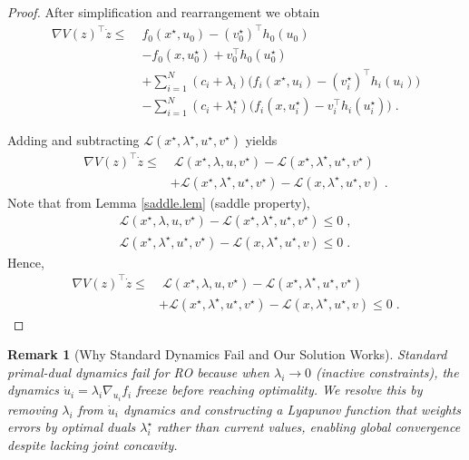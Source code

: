 \documentclass[journal,twoside,web]{ieeecolor}
\newtheorem{remark}{Remark}
\begin{document}
\begin{proof}
After simplification and rearrangement we obtain
\begin{align*}
\nabla V(z)^\top \dot z\leq \; & f_0(x^\star,u_0)-(v_0^\star)^\top
h_0(u_0)\\
&-f_0(x,u_0^\star)+v_0^\top h_0(u_0^\star)\\
&+\sum_{i=1}^N(c_i+\lambda_i) \Big(f_i(x^\star,u_i)-(v_i^\star)^\top h_i(u_i)\Big)\\
&-\sum_{i=1}^N(c_i+\lambda_i^\star) \Big(f_i(x,u_i^\star)-v_i^\top h_i(u_i^\star)\Big)\;.
\end{align*}

Adding and subtracting $\mathcal{L}(x^\star,\lambda^\star,u^\star,v^\star)$ yields
\begin{align} \label{deriv_v}
\nabla V(z)^\top \dot z\leq&\; \mathcal{L}(x^\star,\lambda,u,v^\star)-\mathcal{L}(x^\star,\lambda^\star,u^\star,v^\star)\\
&+\mathcal{L}(x^\star,\lambda^\star,u^\star,v^\star)-\mathcal{L}(x,\lambda^\star,u^\star,v) \;.\nonumber
\end{align}
Note that from Lemma \ref{saddle.lem} (saddle property),
\begin{align*}\mathcal{L}(x^\star,\lambda,u,v^\star)-\mathcal{L}(x^\star,\lambda^\star,u^\star,v^\star)\leq 0\;,
\\
\mathcal{L}(x^\star,\lambda^\star,u^\star,v^\star)-\mathcal{L}(x,\lambda^\star,u^\star,v)\leq 0\;.
\end{align*}
Hence,
\begin{align} \label{deriv_v2}
\nabla V(z)^\top \dot z\leq&\; \mathcal{L}(x^\star,\lambda,u,v^\star)-\mathcal{L}(x^\star,\lambda^\star,u^\star,v^\star)\\
&+\mathcal{L}(x^\star,\lambda^\star,u^\star,v^\star)-\mathcal{L}(x,\lambda^\star,u^\star,v)\leq 0 \;.\nonumber
\end{align}
\end{proof}

\begin{remark}[Why Standard Dynamics Fail and Our Solution Works] \label{remark_reader_notice}
Standard primal-dual dynamics fail for RO because when $\lambda_i \to 0$ (inactive constraints), the dynamics $\dot{u}_i = \lambda_i \nabla_{u_i} f_i$ freeze before reaching optimality. We resolve this by removing $\lambda_i$ from $\dot{u}_i$ dynamics and constructing a Lyapunov function that weights errors by optimal duals $\lambda_i^\star$ rather than current values, enabling global convergence despite lacking joint concavity.
\end{remark}
\end{document}
